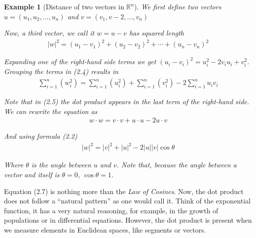 \documentclass{book}
\newtheorem{example}{Example}[chapter]
\begin{document}
\begin{example}[Distance of two vectors in $\mathbb{R}^{n}$]
    We first define two vectors $u=\left(u_1,u_2,\dots,u_n\right)$ and $v=\left(v_1, v-2, \dots, v_n\right)$

    Now, a third vector, we call it $w=u-v$ has squared length
    \begin{equation}
        \begin{split}
            |w|^{2} = (u_1-v_1)^{2} + (u_2-v_2)^{2} + \cdots + (u_n-v_n)^{2}
        \end{split}
    \end{equation}

    Expanding one of the right-hand side terms we get $\left(u_i-v_i\right)^{2} =
        u_i^{2} - 2 v_i u_i + v_i^{2}$. Grouping the terms in (2.4) results in
    \begin{equation}
        \begin{split}
            \sum_{i=1}^{n}{\left(w_i^{2}\right)} = \sum_{i=1}^{n}{\left(u_i^{2}\right)} + \sum_{i=1}^{n}{\left(v_i^{2}\right)} - 2 \sum_{i=1}^{n}{u_i v_i}
        \end{split}
    \end{equation}

    Note that in (2.5) the dot product appears in the last term of the right-hand
    side. We can rewrite the equation as
    \begin{equation}
        \begin{split}
            w \cdot w = v \cdot v + u \cdot u - 2u \cdot v
        \end{split}
    \end{equation}

    And using formula (2.2)
    \begin{equation}
        \begin{split}
            |w|^{2} = |v|^{2} + |u|^{2} - 2|u||v|\cos\theta
        \end{split}
    \end{equation}

    Where $\theta$ is the angle between $u$ and $v$. Note that, because the angle
    between a vector and itself is $\theta = 0$, $\cos\theta = 1$.
\end{example}

Equation (2.7) is nothing more than the \textit{Law of Cosines}. Now, the dot
product does not follow a ``natural pattern'' as one would call it. Think of
the exponential function, it has a very natural reasoning, for example, in the
growth of populations or in differential equations. However, the dot product is
present when we measure elements in Euclidean spaces, like segments or vectors.
\end{document}
